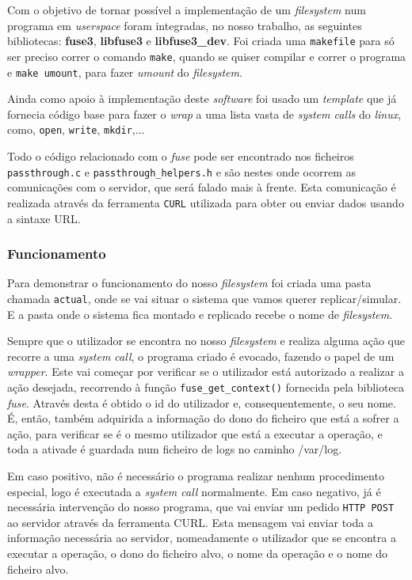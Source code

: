 Com o objetivo de tornar possível a implementação de um \textit{filesystem} num programa em \textit{userspace} foram integradas, no nosso trabalho, as seguintes bibliotecas: \textbf{fuse3}, \textbf{libfuse3} e \textbf{libfuse3\_dev}. Foi criada uma \texttt{makefile} para só ser preciso correr o comando \texttt{make}, quando se quiser compilar e correr o programa e \texttt{make umount}, para fazer \textit{umount} do \textit{filesystem}.

Ainda como apoio à implementação deste \textit{software} foi usado um \textit{template} que já fornecia código base para fazer o \textit{wrap} a uma lista vasta de \textit{system calls} do \textit{linux}, como, \texttt{open}, \texttt{write}, \texttt{mkdir},...

Todo o código relacionado com o \textit{fuse} pode ser encontrado nos ficheiros \texttt{passthrough.c} e \texttt{passthrough\_helpers.h} e são nestes onde ocorrem as comunicações com o servidor, que será falado mais à frente. Esta comunicação é realizada através da ferramenta \texttt{CURL} utilizada para obter ou enviar dados usando a sintaxe URL.

\subsubsection{Funcionamento}

Para demonstrar o funcionamento do nosso \textit{filesystem} foi criada uma pasta chamada \texttt{actual}, onde se vai situar o sistema que vamos querer replicar/simular. E a pasta onde o sistema fica montado e replicado recebe o nome de \textit{filesystem}.

Sempre que o utilizador se encontra no nosso \textit{filesystem} e realiza alguma ação que recorre a uma \textit{system call}, o programa criado é evocado, fazendo o papel de um \textit{wrapper}. Este vai começar por verificar se o utilizador está autorizado a realizar a ação desejada, recorrendo à função \texttt{fuse\_get\_context()} fornecida pela biblioteca \textit{fuse}. Através desta é obtido o id do utilizador e, consequentemente, o seu nome. É, então, também adquirida a informação do dono do ficheiro que está a sofrer a ação, para verificar se é o mesmo utilizador que está a executar a operação, e toda a ativade é guardada num ficheiro de logs no caminho /var/log. 

Em caso positivo, não é necessário o programa realizar nenhum procedimento especial, logo é executada a \textit{system call} normalmente. Em caso negativo, já é necessária intervenção do nosso programa, que vai enviar um pedido \texttt{HTTP POST} ao servidor através da ferramenta CURL. Esta mensagem vai enviar toda a informação necessária ao servidor, nomeadamente o utilizador que se encontra a executar a operação, o dono do ficheiro alvo, o nome da operação e o nome do ficheiro alvo. 

